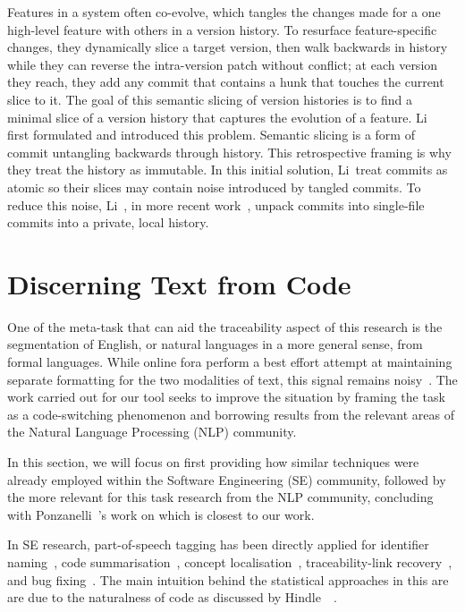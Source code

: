 Features in a system often co-evolve, which tangles the changes made for a one
high-level feature with others in a version history. To resurface
feature-specific changes, they dynamically slice a target version, then walk
backwards in history while they can reverse the intra-version patch without
conflict; at each version they reach, they add any commit that contains a hunk
that touches the current slice to it. The goal of this semantic slicing of
version histories is to find a minimal slice of a version history that captures
the evolution of a feature. Li~\etal~\cite{Li2018, li2015semantic} first
formulated and introduced this problem. Semantic slicing is a form of commit
untangling backwards through history.  This retrospective framing is why they
treat the history as immutable. In this initial solution, Li~\etal treat commits
as atomic so their slices may contain noise introduced by tangled commits. To
reduce this noise, Li~\etal, in more recent work~\cite{Li2019}, unpack commits
into single-file commits into a private, local history.

\section{Discerning Text from Code}
\label{chapter:literature:sec:posit_rel_work}

One of the meta-task that can aid the traceability aspect of this research is
the segmentation of English, or natural languages in a more general sense, from
formal languages. While online fora perform a best effort attempt at maintaining
separate formatting for the two modalities of text, this signal remains
noisy~\cite{ponzanelli2014improving}. The work carried out for our tool seeks to
improve the situation by framing the task as a code-switching phenomenon and
borrowing results from the relevant areas of the Natural Language Processing
(NLP) community.

In this section, we will focus on first providing how similar techniques were
already employed within the Software Engineering (SE) community, followed by the
more relevant for this task research from the NLP community, concluding with
Ponzanelli~\etal's work on \SO which is closest to our work.

In SE research, part-of-speech tagging has been directly applied for identifier
naming~\cite{Binkley2011}, code summarisation~\cite{Haiduc2010a, Haiduc2010b},
concept localisation~\cite{Abebe2010}, traceability-link
recovery~\cite{Capobianco2013}, and bug fixing~\cite{Tian2015}. The main
intuition behind the statistical approaches in this are are due to the
naturalness of code as discussed by Hindle~\etal~\cite{hindle2012naturalness}.

